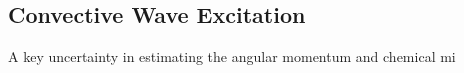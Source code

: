 {\color{purple}
\subsection{Convective Wave Excitation}
}

A key uncertainty in estimating the angular momentum and chemical mi
